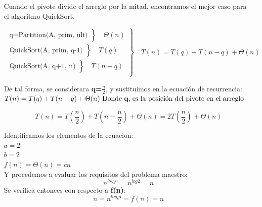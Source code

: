         Cuando el pivote divide el arreglo por la mitad, encontramos el mejor caso para el algoritmo QuickSort.
        
        \begin{equation*}
            \left.
                \begin{aligned}
                    \left.
                        \begin{aligned}
                            \text{q=Partition(A, prim, ult)}
                        \end{aligned}
                    \right\}
                    \quad\Theta(n)
                    \\
                    \left.
                        \begin{aligned}
                            \text{QuickSort(A, prim, q-1)}
                        \end{aligned}
                    \right\}
                    \quad T(q)
                    \\
                    \left.
                        \begin{aligned}
                            \text{QuickSort(A, q+1, n)}
                        \end{aligned}
                    \right\}
                    \quad T(n-q)
                    \\
                \end{aligned}
            \right\}
            \quad T(n) = T(q) + T(n-q) + \Theta(n)
        \end{equation*}
        
        De tal forma, se considerara \textbf{q=$\frac{n}{2}$}, y sustituimos en la ecuación de recurrencia:
        $T(n) = T(q)+T(n-q)+\Theta(n) \text{ Donde \textbf{q}, es la posición del pivote en el arreglo}$
                
        \begin{equation*}
            T(n)=T\left(\frac{n}{2}\right)+T\left(n-\frac{n}{2}\right)+\Theta(n) =2T\left(\frac{n}{2}\right)+\Theta(n)
        \end{equation*}
            
        Identificamos los elementos de la ecuacion:\\
        $a=2$\\
        $b=2$\\
        $f(n)=\Theta(n) = cn$\\
        Y procedemos a evaluar los requisitos del problema maestro:
        \begin{equation*}
            n^{log_ba}=n^{log2}=n
        \end{equation*}
        Se verifica entonces con respecto a \textbf{f(n)}:
        \begin{equation*}
            n=n^{log_ba}=f(n)=n
        \end{equation*}
            
